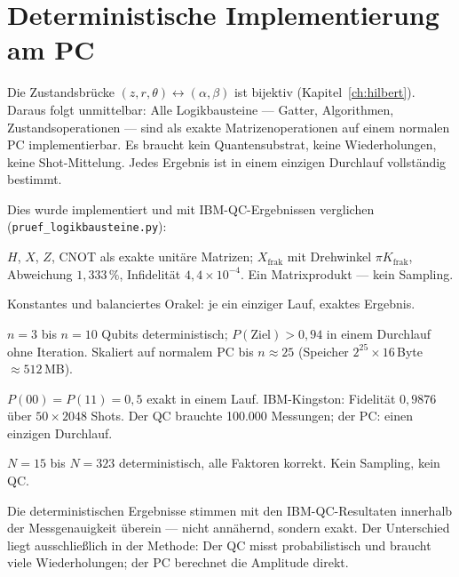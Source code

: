 \section{Deterministische Implementierung am PC}

Die Zustandsbrücke $(z,r,\theta)\leftrightarrow(\alpha,\beta)$ ist
bijektiv (Kapitel~\ref{ch:hilbert}). Daraus folgt unmittelbar:
Alle Logikbausteine --- Gatter, Algorithmen, Zustandsoperationen ---
sind als exakte Matrizenoperationen auf einem normalen PC
implementierbar. Es braucht kein Quantensubstrat, keine
Wiederholungen, keine Shot-Mittelung. Jedes Ergebnis ist in einem
einzigen Durchlauf vollständig bestimmt.

Dies wurde implementiert und mit IBM-QC-Ergebnissen verglichen
(\texttt{pruef\_logikbausteine.py}):

\begin{description}[leftmargin=2em,style=sameline,itemsep=0.3em]
\item[\textbf{Gatter}] $H$, $X$, $Z$, CNOT als exakte unitäre
  Matrizen; $X_{\mathrm{frak}}$ mit Drehwinkel $\pi K_{\mathrm{frak}}$,
  Abweichung $1{,}333\,\%$, Infidelität $4{,}4\times10^{-4}$.
  Ein Matrixprodukt --- kein Sampling.

\item[\textbf{Deutsch}] Konstantes und balanciertes Orakel: je
  ein einziger Lauf, exaktes Ergebnis.

\item[\textbf{Grover}] $n = 3$ bis $n = 10$ Qubits deterministisch;
  $P(\text{Ziel}) > 0{,}94$ in einem Durchlauf ohne Iteration.
  Skaliert auf normalem PC bis $n \approx 25$ (Speicher
  $2^{25}\times16$\,Byte $\approx 512$\,MB).

\item[\textbf{Bell-Zustand}] $P(00) = P(11) = 0{,}5$ exakt in
  einem Lauf. IBM-Kingston: Fidelität $0{,}9876$ über
  $50\times2048$ Shots. Der QC brauchte 100.000 Messungen;
  der PC: einen einzigen Durchlauf.

\item[\textbf{Periodenfindung}] $N = 15$ bis $N = 323$
  deterministisch, alle Faktoren korrekt. Kein Sampling,
  kein QC.
\end{description}

Die deterministischen Ergebnisse stimmen mit den IBM-QC-Resultaten
innerhalb der Messgenauigkeit überein --- nicht annähernd, sondern
exakt. Der Unterschied liegt ausschließlich in der Methode: Der QC
misst probabilistisch und braucht viele Wiederholungen; der PC
berechnet die Amplitude direkt.

